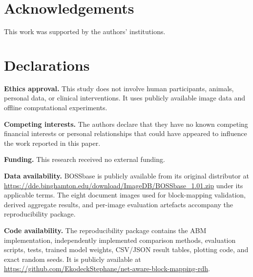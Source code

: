 \documentclass[a4paper,fleqn]{cas-dc}
\begin{document}
\section*{Acknowledgements}
This work was supported by the authors' institutions.

\printcredits

\section*{Declarations}
\noindent\textbf{Ethics approval.}
This study does not involve human participants, animals, personal data, or
clinical interventions. It uses publicly available image data and offline
computational experiments.

\medskip
\noindent\textbf{Competing interests.}
The authors declare that they have no known competing financial interests or
personal relationships that could have appeared to influence the work reported
in this paper.

\medskip
\noindent\textbf{Funding.}
This research received no external funding.

\medskip
\noindent\textbf{Data availability.}
BOSSbase is publicly available from its original distributor at
\url{https://dde.binghamton.edu/download/ImageDB/BOSSbase_1.01.zip} under its
applicable terms. The eight document images used for block-mapping validation,
derived aggregate results, and per-image evaluation artefacts accompany the
reproducibility package.

\medskip
\noindent\textbf{Code availability.}
The reproducibility package contains the ABM implementation, independently
implemented comparison methods, evaluation scripts, tests, trained model
weights, CSV/JSON result tables, plotting code, and exact random seeds. It is
publicly available at
\url{https://github.com/EkodeckStephane/net-aware-block-mapping-rdh}.



\end{document}
